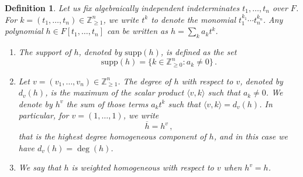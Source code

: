 \documentclass{amsart}
\newtheorem{defn}{Definition}
\def\supp {\mathrm{supp}}
\begin{document}
\begin{defn}
	{\em Let us fix algebraically independent indeterminates $t_1, \dots, t_n$ over $F$. For $k=(t_1,\dots, t_n)\in \mathbb{Z}^n_{\geq 1}$, we write $t^k$ to denote the monomial $t_1^{k_1}\cdots t_n^{k_n}$. Any polynomial $h\in F[t_1,\dots, t_n]$ can be written as $h=\sum_{k}a_kt^k$. 
		\begin{enumerate}
			\item The
			{\em support} of $h$, denoted by $\supp(h)$, is defined as the set
			\begin{equation}\nonumber
				\supp(h)=\{k\in \mathbb{Z}^n_{\geq 0}: a_k\neq 0\}\,.
			\end{equation}
			\item Let $v=(v_1,\dots,v_n)\in \mathbb{Z}^n_{\geq 1}$. The {\em degree} of $h$ with respect to $v$, denoted by $d_v(h)$, is the maximum of the scalar product $\langle v,k\rangle$ such that $a_{k}\neq 0$. We denote by $h^{
				v}$ the sum of those terms $a_{k}t^{k}$ such that  $\langle v,k\rangle=d_v(h)$. In particular,  for $v=(1,\dots,1)$, we write $$\overline{h}=h^v\,,$$ that is the highest degree homogeneous component of $h$, and in this case we have $d_v(h)=\deg(h)$.
			\item  We say that $h$ is {\em weighted homogeneous} with respect to $v$ when $h^{v}=h$.
		\end{enumerate}
		
	}
\end{defn}
\end{document}
